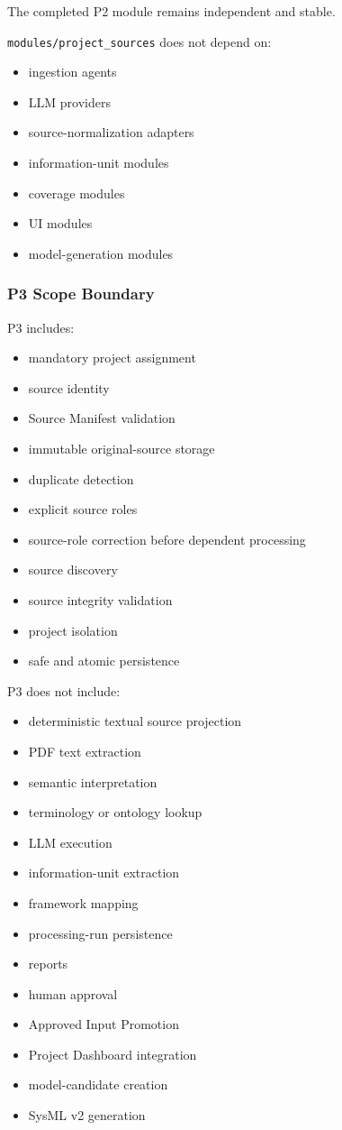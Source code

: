The completed P2 module remains independent and stable.

\texttt{modules/project\_sources} does not depend on:

\begin{itemize}
\tightlist
\item
  ingestion agents
\item
  LLM providers
\item
  source-normalization adapters
\item
  information-unit modules
\item
  coverage modules
\item
  UI modules
\item
  model-generation modules
\end{itemize}

\hypertarget{p3-scope-boundary}{%
\subsubsection{P3 Scope Boundary}\label{p3-scope-boundary}}

P3 includes:

\begin{itemize}
\tightlist
\item
  mandatory project assignment
\item
  source identity
\item
  Source Manifest validation
\item
  immutable original-source storage
\item
  duplicate detection
\item
  explicit source roles
\item
  source-role correction before dependent processing
\item
  source discovery
\item
  source integrity validation
\item
  project isolation
\item
  safe and atomic persistence
\end{itemize}

P3 does not include:

\begin{itemize}
\tightlist
\item
  deterministic textual source projection
\item
  PDF text extraction
\item
  semantic interpretation
\item
  terminology or ontology lookup
\item
  LLM execution
\item
  information-unit extraction
\item
  framework mapping
\item
  processing-run persistence
\item
  reports
\item
  human approval
\item
  Approved Input Promotion
\item
  Project Dashboard integration
\item
  model-candidate creation
\item
  SysML v2 generation
\end{itemize}

